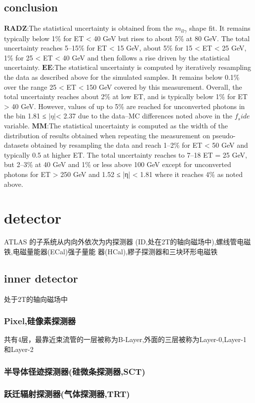 \documentclass{ctexart}
\begin{document}
\subsection{conclusion}
$\mathbf{RADZ}$:The statistical uncertainty is obtained from the $m_{ll\gamma}$ shape
fit. It remains typically below 1\% for ET < 40 GeV but rises
to about 5\% at 80 GeV. The total uncertainty reaches 5–15\%
for ET < 15 GeV, about 5\% for 15 < ET < 25 GeV, 1\%
for 25 < ET < 40 GeV and then follows a rise driven by the
statistical uncertainty.
$\mathbf{EE}$:The statistical uncertainty is computed by iteratively resampling
the data as described above for the simulated samples.
It remains below 0.1\% over the range 25 < ET < 150 GeV
covered by this measurement. Overall, the total uncertainty
reaches about 2\% at low ET, and is typically below 1\% for
ET > 40 GeV. However, values of up to 5\% are reached for
unconverted photons in the bin 1.81 ≤ $|\eta|$< 2.37 due to
the data–MC differences noted above in the $f_side$ variable.
$\mathbf{MM}$:The statistical uncertainty is computed as the width of the
distribution of results obtained when repeating the measurement
on pseudo-datasets obtained by resampling the data
and reach 1–2\% for ET < 50 GeV and typically 0.5%
at higher ET. The total uncertainty reaches to 7–18%
ET = 25 GeV, but 2–3\% at 40 GeV and 1\% or less above
100 GeV except for unconverted photons for ET > 250 GeV
and 1.52 ≤ |η| < 1.81 where it reaches 4\% as noted above.
\section{detector}
ATLAS 的⼦系统从内向外依次为内探测器
(ID,处在2T的轴向磁场中),螺线管电磁铁,电磁量能器(ECal)强⼦量能
器(HCal),繆⼦探测器和三块环形电磁铁
\subsection{inner detector}
处于2T的轴向磁场中
\subsubsection{Pixel,硅像素探测器}
共有4层，最靠近束流管的一层被称为B-Layer,外面的三层被称为Layer-0,Layer-1和Layer-2
\subsubsection{半导体径迹探测器(硅微条探测器,SCT)}
\subsubsection{跃迁辐射探测器(气体探测器,TRT)}
\end{document}
